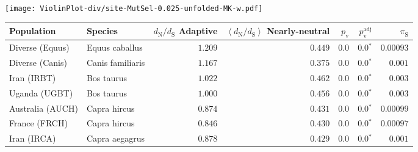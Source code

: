 \begin{center}
\begin{adjustbox}{width = 1\textwidth}
\begin{tabular}{|l|l|r|r|r|r|r|r|r|}
\bottomrule
\end{tabular}
\end{adjustbox}
\newpage
\texttt{[image: ViolinPlot-div/site-MutSel-0.025-unfolded-MK-w.pdf]} 
\begin{adjustbox}{width = 1\textwidth}
\begin{tabular}{|l|l|r|r|r|r|r|}
\toprule
                     Population &              Species & \specialcell{$d_{\mathrm{N}} / d_{\mathrm{S}}$ \\ Adaptive} & \specialcell{$\left< d_{\mathrm{N}} / d_{\mathrm{S}} \right>$ \\ Nearly-neutral} & $p_{\mathrm{v}}$ & $p_{\mathrm{v}}^{\mathrm{adj}}$ & $\pi_{\textrm{S}}$ \\
\midrule
                Diverse (Equus) &       Equus caballus &                                           $ 1.209$ &                                           $ 0.449$ &            $0.0$ &                  $\bm{0.0{^*}}$ &          $0.00093$ \\
                Diverse (Canis) &     Canis familiaris &                                           $ 1.167$ &                                           $ 0.375$ &            $0.0$ &                  $\bm{0.0{^*}}$ &           $ 0.001$ \\
                    Iran (IRBT) &           Bos taurus &                                           $ 1.022$ &                                           $ 0.462$ &            $0.0$ &                  $\bm{0.0{^*}}$ &           $ 0.003$ \\
                  Uganda (UGBT) &           Bos taurus &                                           $ 1.000$ &                                           $ 0.456$ &            $0.0$ &                  $\bm{0.0{^*}}$ &           $ 0.003$ \\
               Australia (AUCH) &         Capra hircus &                                           $ 0.874$ &                                           $ 0.431$ &            $0.0$ &                  $\bm{0.0{^*}}$ &          $0.00099$ \\
                  France (FRCH) &         Capra hircus &                                           $ 0.846$ &                                           $ 0.430$ &            $0.0$ &                  $\bm{0.0{^*}}$ &          $0.00097$ \\
                    Iran (IRCA) &       Capra aegagrus &                                           $ 0.878$ &                                           $ 0.429$ &            $0.0$ &                  $\bm{0.0{^*}}$ &           $ 0.001$ \\

\end{tabular}
\end{adjustbox}
\end{center}
